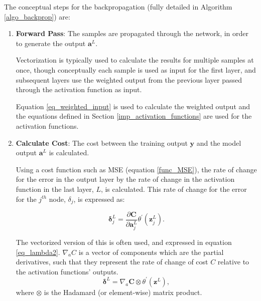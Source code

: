\documentclass[a4paper,11pt,oneside]{article}
\theoremstyle{plain}
\theoremstyle{definition}
\begin{document}
	The conceptual steps for the backpropagation (fully detailed in Algorithm \ref{algo_backprop}) are: \newline
	\begin{enumerate}
		\item \textbf{Forward Pass}: The samples are propagated through the network, in order to generate the output $\mathbf{a}^L$. \newline 
		
		Vectorization is typically used to calculate the results for multiple samples at once, though conceptually each sample is used as input for the first layer, and subsequent layers use the weighted output from the previous layer passed through the activation function as input.\newline 
		
		Equation \ref{eq_weighted_input} is used to calculate the weighted output and the equations defined in Section \ref{imp_activation_functions} are used for the activation functions.
		\newline
		
		\item \textbf{Calculate Cost}: The cost between the training output $\mathbf{y}$ and the model output $\mathbf{a}^L$ is calculated. \newline
		
		Using a cost function such as MSE (equation \eqref{func_MSE}), the rate of change for the error in the output layer by the rate of change in the activation function in the last layer, $L$, is calculated. This rate of change for the error for the $j^{th}$ node, $\delta_j$, is expressed as:	
		
		\begin{equation}\label{eq_lambda1}
		\mathbf{\delta}_{j}^{L}=\frac{\partial \mathbf{C}}{\partial \mathbf{a}_{j}^{L}} \theta^{\prime}\left(\mathbf{z}_{j}^{L}\right) .
		\end{equation}
		
		The vectorized version of this is often used, and expressed in equation \eqref{eq_lambda2}. $\nabla_a C$ is a vector of components which are the partial derivatives, such that they represent the rate of change of cost $C$ relative to the activation functions' outputs.
		\begin{equation}\label{eq_lambda2}
		\mathbf{\delta}^{L}=\nabla_a \mathbf{C} \otimes \theta^{\prime}(\mathbf{z}^L), 
		\end{equation}
		where $\otimes$ is the Hadamard (or element-wise) matrix product.\newline
		

\end{enumerate}
\end{document}
